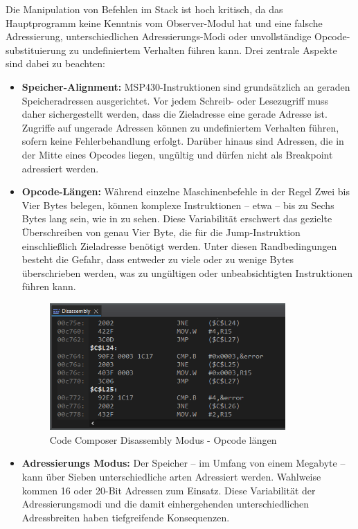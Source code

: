 Die Manipulation von Befehlen im Stack ist hoch kritisch, da das Hauptprogramm keine Kenntnis vom Observer-Modul hat und eine falsche Adressierung, unterschiedlichen Adressierungs-Modi oder unvollst\"andige Opcode-substituierung zu undefiniertem Verhalten f\"uhren kann. Drei zentrale Aspekte sind dabei zu beachten:

\begin{itemize}
	\item \textbf{Speicher-Alignment:} MSP430-Instruktionen sind grunds\"atzlich an geraden Speicheradressen ausgerichtet. Vor jedem Schreib- oder Lesezugriff muss daher sichergestellt werden, dass die Zieladresse eine gerade Adresse ist. Zugriffe auf ungerade Adressen k\"onnen zu undefiniertem Verhalten f\"uhren, sofern keine Fehlerbehandlung erfolgt. Dar\"uber hinaus sind Adressen, die in der Mitte eines Opcodes liegen, ung\"ultig und d\"urfen nicht als Breakpoint adressiert werden.
	
	\item \textbf{Opcode-L\"angen:} W\"ahrend einzelne Maschinenbefehle in der Regel Zwei bis Vier Bytes belegen, k\"onnen komplexe Instruktionen – etwa  – bis zu Sechs Bytes lang sein, wie in  zu sehen.  Diese Variabilit\"at erschwert das gezielte \"Uberschreiben von genau Vier Byte, die f\"ur die Jump-Instruktion einschlie{\ss}lich Zieladresse ben\"otigt werden. Unter diesen Randbedingungen besteht die Gefahr, dass entweder zu viele oder zu wenige Bytes \"uberschrieben werden, was zu ung\"ultigen oder unbeabsichtigten Instruktionen f\"uhren kann.
	
	\begin{figure}[h!]
		\centering
		\includegraphics[width=0.85\textwidth]{../Bilder/OpcodeLaengen.png}
		\caption{Code Composer Disassembly Modus - Opcode l\"angen}
		\label{fig:DisassemblyOpcodeLaengen}
	\end{figure}
	
	\newpage
	\item \textbf{Adressierungs Modus:} Der Speicher -- im Umfang von einem Megabyte -- kann \"uber Sieben unterschiedliche arten Adressiert werden. Wahlweise kommen 16 oder 20-Bit Adressen zum Einsatz. Diese Variabilit\"at der Adressierungsmodi und die damit einhergehenden unterschiedlichen Adressbreiten haben tiefgreifende Konsequenzen. 
\end{itemize}

